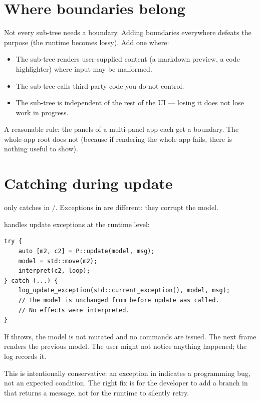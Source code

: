 \section{Where boundaries belong}

Not every sub-tree needs a boundary. Adding boundaries
everywhere defeats the purpose (the runtime becomes lossy). Add
one where:

\begin{itemize}[leftmargin=*]
  \item The sub-tree renders user-supplied content (a markdown
    preview, a code highlighter) where input may be malformed.
  \item The sub-tree calls third-party code you do not control.
  \item The sub-tree is independent of the rest of the UI ---
    losing it does not lose work in progress.
\end{itemize}

A reasonable rule: the panels of a multi-panel app each get a
boundary. The whole-app root does not (because if rendering the
whole app fails, there is nothing useful to show).

\section{Catching during update}

 only catches in /.
Exceptions in  are different: they corrupt the
model.

\maya{} handles update exceptions at the runtime level:

\begin{lstlisting}
try {
    auto [m2, c2] = P::update(model, msg);
    model = std::move(m2);
    interpret(c2, loop);
} catch (...) {
    log_update_exception(std::current_exception(), model, msg);
    // The model is unchanged from before update was called.
    // No effects were interpreted.
}
\end{lstlisting}

If  throws, the model is not mutated and no
commands are issued. The next frame renders the previous model.
The user might not notice anything happened; the log records it.

This is intentionally conservative: an exception in 
indicates a programming bug, not an expected condition. The
right fix is for the developer to add a branch in 
that returns a message, not for the runtime to silently retry.

